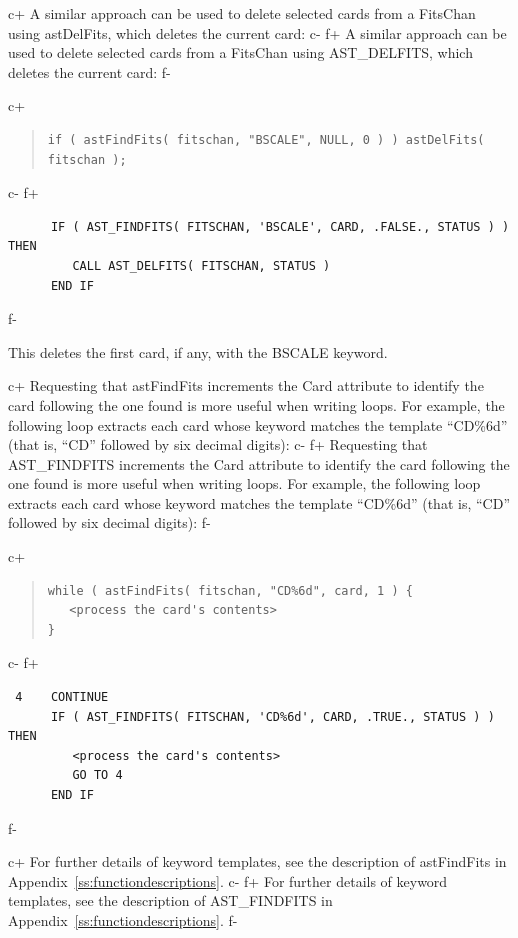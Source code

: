 \documentclass[twoside,11pt]{article}
\newcommand{\appref}[1]{Appendix~\ref{#1}}
\newcommand{\appref}[1]{\ref{#1}}
\begin{document}
c+
A similar approach can be used to delete selected cards from a
FitsChan using astDelFits, which deletes the current card:
c-
f+
A similar approach can be used to delete selected cards from a
FitsChan using AST\_DELFITS, which deletes the current card:
f-

c+
\begin{quote}
\small
\begin{verbatim}
if ( astFindFits( fitschan, "BSCALE", NULL, 0 ) ) astDelFits( fitschan );
\end{verbatim}
\normalsize
\end{quote}
c-
f+
\small
\begin{verbatim}
      IF ( AST_FINDFITS( FITSCHAN, 'BSCALE', CARD, .FALSE., STATUS ) ) THEN
         CALL AST_DELFITS( FITSCHAN, STATUS )
      END IF
\end{verbatim}
\normalsize
f-

This deletes the first card, if any, with the BSCALE keyword.

c+
Requesting that astFindFits increments the Card attribute to identify
the card following the one found is more useful when writing loops.
For example, the following loop extracts each card whose keyword
matches the template ``CD\%6d'' (that is, ``CD'' followed by six
decimal digits):
c-
f+
Requesting that AST\_FINDFITS increments the Card attribute to
identify the card following the one found is more useful when writing
loops.  For example, the following loop extracts each card whose
keyword matches the template ``CD\%6d'' (that is, ``CD'' followed by
six decimal digits):
f-

c+
\begin{quote}
\small
\begin{verbatim}
while ( astFindFits( fitschan, "CD%6d", card, 1 ) {
   <process the card's contents>
}
\end{verbatim}
\normalsize
\end{quote}
c-
f+
\small
\begin{verbatim}
 4    CONTINUE
      IF ( AST_FINDFITS( FITSCHAN, 'CD%6d', CARD, .TRUE., STATUS ) ) THEN
         <process the card's contents>
         GO TO 4
      END IF
\end{verbatim}
\normalsize
f-

c+
For further details of keyword templates, see the description of
astFindFits in \appref{ss:functiondescriptions}.
c-
f+
For further details of keyword templates, see the description of
AST\_FINDFITS in \appref{ss:functiondescriptions}.
f-
\end{document}

